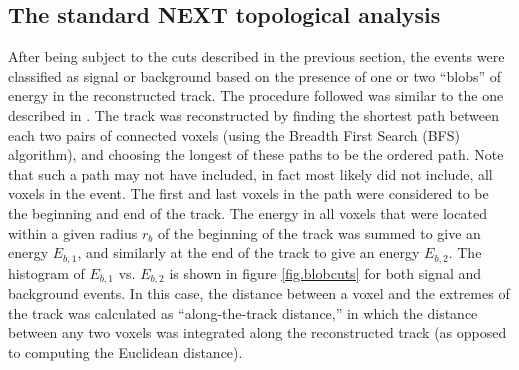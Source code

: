 \documentclass[a4paper,11pt]{article}
\begin{document}
\subsection{The standard NEXT topological analysis}\label{ssec:TopologicalAnalysis}
After being subject to the cuts described in the previous section, the events were classified as signal or background based on the presence of one or two ``blobs'' of energy in the
reconstructed track.  The procedure followed was similar to the one described in \cite{NEXT_topology, Martin-Albo:2015rhw}.  The track was reconstructed by finding the shortest path between each two 
pairs of connected voxels (using the Breadth First Search (BFS) algorithm), and choosing the longest of these paths to be the ordered path.  Note that such a path may not have included, 
in fact most likely did not include, all voxels in the event.  The first and last voxels in the path
were considered to be the beginning and end of the track.  The energy in all voxels that were located within a given radius $r_b$ of the beginning of the track was summed to give
an energy $E_{b,1}$, and similarly at the end of the track to give an energy $E_{b,2}$.  The histogram of $E_{b,1}$ vs. $E_{b,2}$ is shown in figure \ref{fig.blobcuts} for both signal and
background events.  In this case, the distance between a voxel and the extremes of the track was calculated as 
``along-the-track distance,'' in which the distance between any two voxels was integrated along the reconstructed track (as opposed to computing the Euclidean distance). 
\end{document}
